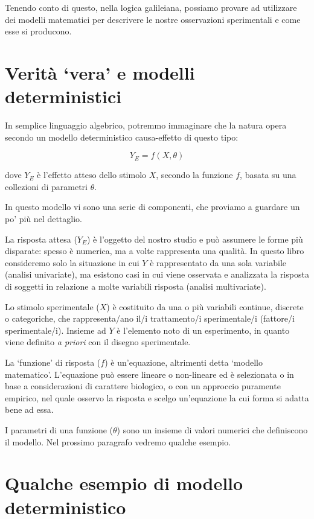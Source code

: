 \documentclass[a4paper,12pt,oneside]{book}
\theoremstyle{definition}
\theoremstyle{definition}
\theoremstyle{definition}
\theoremstyle{remark}
\begin{document}
Tenendo conto di questo, nella logica galileiana, possiamo provare ad
utilizzare dei modelli matematici per descrivere le nostre osservazioni
sperimentali e come esse si producono.

\section{\texorpdfstring{Verità `vera' e modelli
deterministici}{Verità vera e modelli deterministici}}\label{verita-vera-e-modelli-deterministici}

In semplice linguaggio algebrico, potremmo immaginare che la natura
opera secondo un modello deterministico causa-effetto di questo tipo:

\[ Y_E = f(X, \theta) \]

dove \(Y_E\) è l'effetto atteso dello stimolo \(X\), secondo la funzione
\(f\), basata su una collezioni di parametri \(\theta\).

In questo modello vi sono una serie di componenti, che proviamo a
guardare un po' più nel dettaglio.

La risposta attesa (\(Y_E\)) è l'oggetto del nostro studio e può
assumere le forme più disparate: spesso è numerica, ma a volte
rappresenta una qualità. In questo libro consideremo solo la situazione
in cui \(Y\) è rappresentato da una sola variabile (analisi univariate),
ma esistono casi in cui viene osservata e analizzata la risposta di
soggetti in relazione a molte variabili risposta (analisi multivariate).

Lo stimolo sperimentale (\(X\)) è costituito da una o più variabili
continue, discrete o categoriche, che rappresenta/ano il/i trattamento/i
sperimentale/i (fattore/i sperimentale/i). Insieme ad \(Y\) è l'elemento
noto di un esperimento, in quanto viene definito \emph{a priori} con il
disegno sperimentale.

La `funzione' di risposta (\(f\)) è un'equazione, altrimenti detta
`modello matematico'. L'equazione può essere lineare o non-lineare ed è
selezionata o in base a considerazioni di carattere biologico, o con un
approccio puramente empirico, nel quale osservo la risposta e scelgo
un'equazione la cui forma si adatta bene ad essa.

I parametri di una funzione (\(\theta\)) sono un insieme di valori
numerici che definiscono il modello. Nel prossimo paragrafo vedremo
qualche esempio.

\section{Qualche esempio di modello
deterministico}\label{qualche-esempio-di-modello-deterministico}
\end{document}
